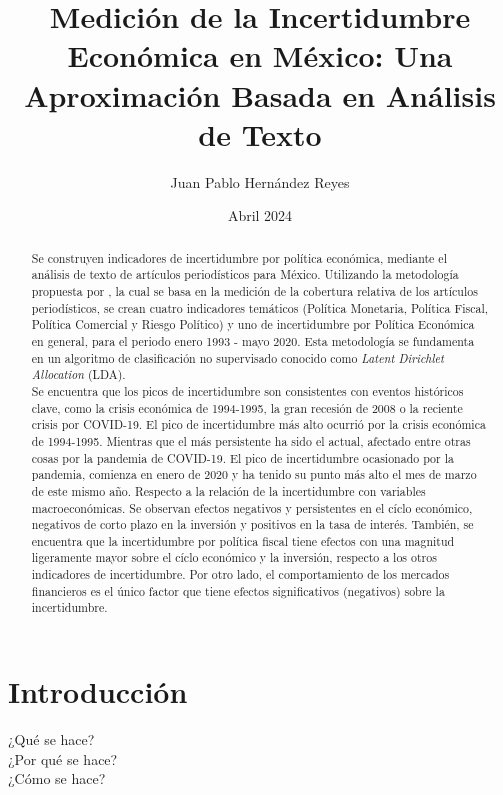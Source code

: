 \documentclass[11pt,a4paper]{article}
\title{Medición de la Incertidumbre Económica en México: Una Aproximación Basada en Análisis de Texto}
\date{Abril 2024}
\author{Juan Pablo Hernández Reyes}
\begin{document}
\maketitle

\begin{abstract}
Se construyen indicadores de incertidumbre por política económica, mediante el análisis de texto de artículos periodísticos para México. 
Utilizando la metodología propuesta por \cite{azqueta_2017}, la cual se basa en la medición de la cobertura relativa de los artículos periodísticos, se crean cuatro indicadores temáticos (Política Monetaria, Política Fiscal, Política Comercial y Riesgo Político) y uno de incertidumbre por Política Económica en general, para el periodo enero 1993 - mayo 2020. 
Esta metodología se fundamenta en un algoritmo de clasificación no supervisado conocido como \textit{Latent Dirichlet Allocation} (LDA). \\

Se encuentra que los picos de incertidumbre son consistentes con eventos históricos clave, como la crisis económica de 1994-1995, la gran recesión de 2008 o la reciente crisis por COVID-19. 
El pico de incertidumbre más alto ocurrió por la crisis económica de 1994-1995. Mientras que el más persistente ha sido el actual, afectado entre otras cosas por la pandemia de COVID-19. El pico de incertidumbre ocasionado por la pandemia, comienza en enero de 2020 y ha tenido su punto más alto el mes de marzo de este mismo año. 
Respecto a la relación de la incertidumbre con variables macroeconómicas. Se observan efectos negativos y persistentes en el cíclo económico, negativos de corto plazo en la inversión y positivos en la tasa de interés. 
También, se encuentra que la incertidumbre por política fiscal tiene efectos con una magnitud ligeramente mayor sobre el cíclo económico y la inversión, respecto a los otros indicadores de incertidumbre.  Por otro lado, el comportamiento de los mercados financieros es el único factor que tiene efectos significativos (negativos) sobre la incertidumbre.
\end{abstract}

\section{Introducción}
¿Qué se hace? \\
¿Por qué se hace? \\
¿Cómo se hace?
\end{document}
